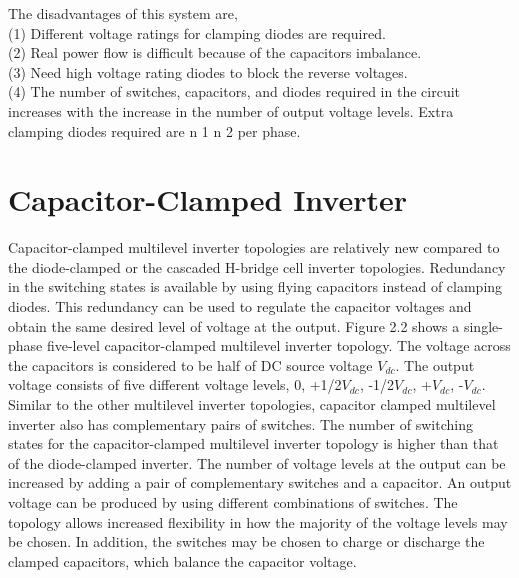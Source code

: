 \documentclass[12pt,a4paper]{report}
\begin{document}
The disadvantages of this system are,\\
(1) Different voltage ratings for clamping diodes are required.\\
(2) Real power flow is difficult because of the capacitors
imbalance.\\
(3) Need high voltage rating diodes to block the reverse voltages.\\
(4) The number of switches, capacitors, and diodes required in
the circuit increases with the increase in the number of output
voltage levels. Extra clamping diodes required are
n 1 n 2 per phase.\\

\section{Capacitor-Clamped Inverter}
Capacitor-clamped multilevel inverter topologies are relatively new
compared to the diode-clamped or the cascaded H-bridge cell inverter
topologies. Redundancy in the switching states is available by using flying
capacitors instead of clamping diodes. This redundancy can be used to
regulate the capacitor voltages and obtain the same desired level of voltage at
the output. Figure 2.2 shows a single-phase five-level capacitor-clamped
multilevel inverter topology. The voltage across the capacitors is considered
to be half of DC source voltage $V_{dc}$. The output voltage consists of five
different voltage levels,  0, +1/2$V_{dc}$, -1/2$V_{dc}$, +$V_{dc}$, -$V_{dc}$.
Similar to the other multilevel inverter topologies, capacitor clamped
multilevel inverter also has complementary pairs of switches. The number of switching states for the
capacitor-clamped multilevel inverter topology is higher than that of the
diode-clamped inverter. The number of voltage levels at the output can be
increased by adding a pair of complementary switches and a capacitor. An
output voltage can be produced by using different combinations of switches.
The topology allows increased flexibility in how the majority of the voltage
levels may be chosen. In addition, the switches may be chosen to charge or
discharge the clamped capacitors, which balance the capacitor voltage.
\end{document}
